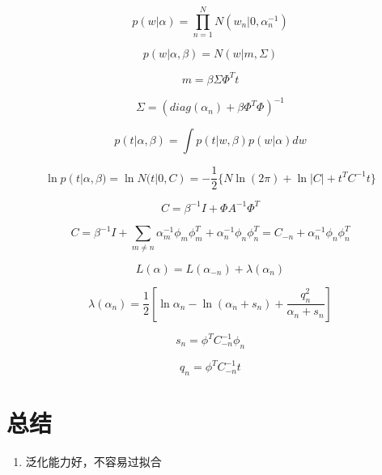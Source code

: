 \begin{equation}
p(w|\alpha) = \prod_{n=1}^NN(w_n|0, \alpha_n^{-1})
\end{equation}

\begin{equation}
p(w|\alpha, \beta) = N(w|m, \Sigma)
\end{equation}

\begin{equation}
m = \beta\Sigma\Phi^Tt
\end{equation}

\begin{equation}
\Sigma = (diag(\alpha_n) + \beta\Phi^T\Phi)^{-1}
\end{equation}

\begin{equation}
p(t|\alpha, \beta) = \int p(t|w,\beta)p(w|\alpha)dw
\end{equation}

\begin{equation}
\ln p(t|\alpha, \beta) = \ln N(t|0, C)
= -\frac{1}{2}\{N \ln(2\pi) + \ln|C| + t^TC^{-1}t\}
\end{equation}

\begin{equation}
C = \beta^{-1}I + \Phi A^{-1}\Phi^T
\end{equation}

\begin{equation}
C = \beta^{-1}I + \sum_{m\neq n}\alpha_{m}^{-1}\phi_m\phi_m^T 
+ \alpha_n^{-1}\phi_n\phi_n^T
= C_{-n} + \alpha_n^{-1}\phi_n\phi_n^T 
\end{equation}

\begin{equation}
L(\alpha) = L(\alpha_{-n}) + \lambda(\alpha_n)
\end{equation}

\begin{equation}
\lambda(\alpha_n) = \frac{1}{2}
[\ln \alpha_n - \ln(\alpha_n + s_n) + \frac{q_n^2}{\alpha_n + s_n}]
\end{equation}

\begin{equation}
s_n = \phi^TC_{-n}^{-1}\phi_n
\end{equation}

\begin{equation}
q_n = \phi^TC_{-n}^{-1}t
\end{equation}

\section{总结}
\begin{enumerate}
\item 泛化能力好，不容易过拟合
\cite{longxing2012machinelearning}
\end{enumerate}
